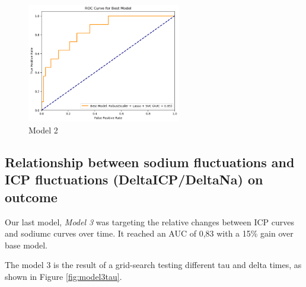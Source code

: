 \begin{figure}[h]
    \centering
    \includegraphics[width=0.6\textwidth]{pictures/fig6_model2.png}
    \caption{Model 2} %
    \label{fig:model2} %
\end{figure}

\subsection{Relationship between sodium fluctuations and ICP fluctuations (DeltaICP/DeltaNa) on outcome}
Our last model, \textit{Model 3} was targeting the relative changes between ICP curves and sodiumc curves over time. It reached an AUC of 0,83 with a 15\% gain  over base model. 

The model 3 is the result of a grid-search testing different tau and delta times, as shown in Figure \ref{fig:model3tau}.


